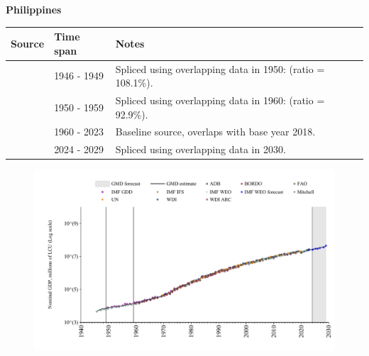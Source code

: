 \documentclass[12pt,a4paper,landscape]{article}
\begin{document}
\begin{adjustbox}{max totalsize={\paperwidth}{\paperheight},center}
\begin{minipage}[t][\textheight][t]{\textwidth}
\vspace*{0.5cm}
{}
\begin{center}
{\Large\bfseries Philippines}
\end{center}
\vspace{0.5cm}
\begin{table}[H]
\centering
\small
\begin{tabular}{|l|l|l|}
\hline
\textbf{Source} & \textbf{Time span} & \textbf{Notes} \\
\hline
\rowcolor{white}\cite{Mitchell}& 1946 - 1949 &Spliced using overlapping data in 1950: (ratio = 108.1\%).\\
\rowcolor{lightgray}\cite{IMF_GDD}& 1950 - 1959 &Spliced using overlapping data in 1960: (ratio = 92.9\%).\\
\rowcolor{white}\cite{WDI}& 1960 - 2023 &Baseline source, overlaps with base year 2018.\\
\rowcolor{lightgray}\cite{IMF_WEO_forecast}& 2024 - 2029 &Spliced using overlapping data in 2030.\\
\hline
\end{tabular}
\end{table}
\begin{figure}[H]
\centering
\includegraphics[width=\textwidth,height=0.6\textheight,keepaspectratio]{graphs/PHL_nGDP.pdf}
\end{figure}
\end{minipage}
\end{adjustbox}
\end{document}
